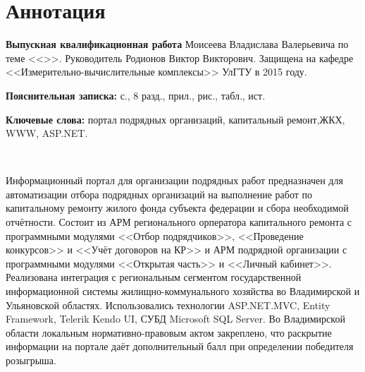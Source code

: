 
\section*{Аннотация}

\textbf{Выпускная квалификационная работа} Моисеева Владислава Валерьевича по теме <<\WorkName>>.
Руководитель Родионов Виктор Викторович.
Защищена на кафедре <<Измерительно-вычислительные комплексы>> УлГТУ в 2015 году.

\textbf{Пояснительная записка:}  с., 8 разд.,  прил.,  рис.,  табл.,  ист.

\textbf{Ключевые слова:} портал подрядных организаций, капитальный ремонт,\linebreak ЖКХ, WWW, ASP.NET. 

~

Информационный портал для организации подрядных работ предназначен для автоматизации отбора подрядных организаций на выполнение работ по капитальному ремонту жилого фонда субъекта федерации и сбора необходимой отчётности.
Состоит из АРМ регионального орператора капитального ремонта с программными модулями <<Отбор подрядчиков>>, <<Проведение конкурсов>> и <<Учёт договоров на КР>> и АРМ подрядной организации с программными модулями <<Открытая часть>> и <<Личный кабинет>>.
Реализована интеграция с региональным сегментом государственной информационной системы жилищно-коммунального хозяйства во Владимирской и Ульяновской областях.
Использовались технологии \linebreak ASP.NET.MVC, Entity Framework, Telerik Kendo UI, СУБД Microsoft SQL Server.
Во Владимирской области локальным нормативно-правовым актом закреплено, что раскрытие информации на портале даёт дополнительный балл при определении победителя розыгрыша. 

\clearpage
\newpage